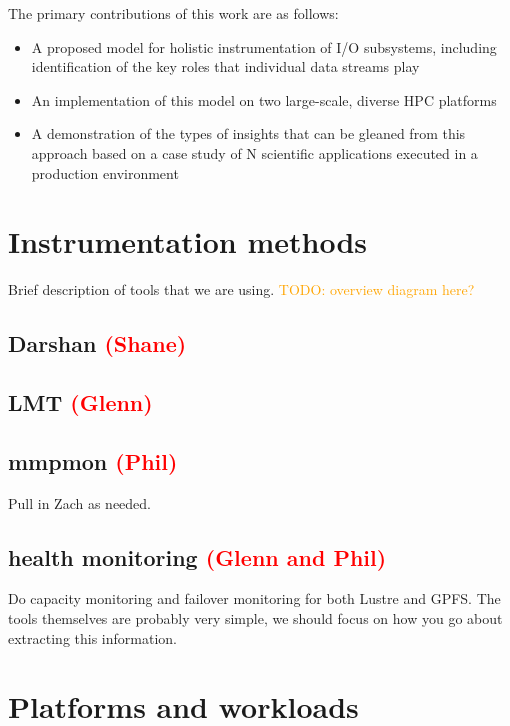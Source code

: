 \documentclass[conference,10pt,compsocconf]{IEEEtran}
\newcommand{\assign}[1]{\textcolor{red}{(#1)}}
\newcommand{\todo}[1]{\textcolor{Orange}{TODO: #1}}
\begin{document}
The primary contributions of this work are as follows:

\begin{itemize}
\item A proposed model for holistic instrumentation of I/O subsystems,
including identification of the key roles that individual data streams play
\item An implementation of this model on two large-scale, diverse HPC
platforms
\item A demonstration of the types of insights that can be gleaned from this
approach based on a case study of N scientific applications executed in a
production environment
\end{itemize}

\section{Instrumentation methods}

Brief description of tools that we are using.
\todo{overview diagram here?}

\subsection{Darshan \assign{Shane}}

\subsection{LMT \assign{Glenn}}

\subsection{mmpmon \assign{Phil}}

Pull in Zach as needed.

\subsection{health monitoring \assign{Glenn and Phil}}

Do capacity monitoring and failover monitoring for both Lustre and GPFS.  The
tools themselves are probably very simple, we should focus on how you go
about extracting this information.

\section{Platforms and workloads}
\end{document}
